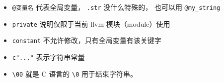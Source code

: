 \begin{itemize}
\item \verb`@变量名` 代表全局变量， \verb`.str` 没什么特殊的， 也可以用 \verb`@my_string`
\item \verb`private` 说明仅限于当前 llvm 模块（module）使用
\item \verb`constant` 不允许修改，只有全局变量有该关键字
\item \verb`c"..."` 表示字符串常量
\item \verb`\00` 就是 C 语言的 \verb`\0` 用于结束字符串。
\end{itemize}
